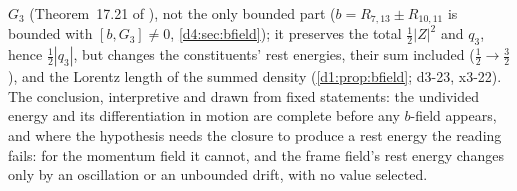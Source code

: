 $G_3$ (Theorem~17.21 of \cite{ES17}), not the only bounded part ($b=R_{7,13}\pm R_{10,11}$ is bounded with $[b,G_3]\neq0$, \cref{d4:sec:bfield}); it
preserves the total $\tfrac12|Z|^2$ and $q_3$, hence $\tfrac12|q_3|$, but changes the constituents' rest energies, their sum included
($\tfrac12\to\tfrac32$), and the Lorentz length of the summed density (\cref{d1:prop:bfield}; d3-23, x3-22). The conclusion, interpretive and
drawn from fixed statements: the undivided energy and its differentiation in motion are complete before any $b$-field appears, and where the
hypothesis needs the closure to produce a rest energy the reading fails: for the momentum field it cannot, and the frame field's rest energy changes only
by an oscillation or an unbounded drift, with no value selected.
